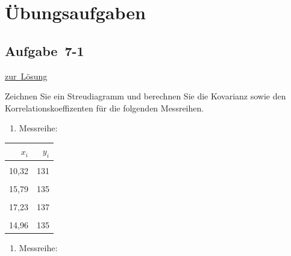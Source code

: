 \documentclass[
  11pt,
  ngerman,
  a4paper,
]{report}
\providecommand{\tightlist}{%
  \setlength{\itemsep}{0pt}\setlength{\parskip}{0pt}}
\begin{document}
\hypertarget{uxfcbungsaufgaben-6}{%
\section*{Übungsaufgaben}\label{uxfcbungsaufgaben-6}}

\hypertarget{aufgabe-7-1}{%
\subsection{Aufgabe~7-1}\label{aufgabe-7-1}}

\protect\hyperlink{loesung-7-1}{zur~Lösung}

Zeichnen Sie ein Streudiagramm und berechnen Sie die Kovarianz sowie den Korrelationskoeffizenten für die folgenden Messreihen.

\begin{enumerate}
\def\labelenumi{\alph{enumi})}
\tightlist
\item
  Messreihe:
\end{enumerate}

\begin{table}
\centering
\begin{tabular}{rr}
\toprule
\textbf{$x_i$} & \textbf{$y_i$}\\
\midrule
\cellcolor{gray!6}{14,21} & \cellcolor{gray!6}{134}\\
10,32 & 131\\
\cellcolor{gray!6}{13,82} & \cellcolor{gray!6}{134}\\
15,79 & 135\\
\cellcolor{gray!6}{14,70} & \cellcolor{gray!6}{134}\\
17,23 & 137\\
\cellcolor{gray!6}{14,84} & \cellcolor{gray!6}{136}\\
14,96 & 135\\
\bottomrule
\end{tabular}
\end{table}

\begin{enumerate}
\def\labelenumi{\alph{enumi})}
\setcounter{enumi}{1}
\tightlist
\item
  Messreihe:
\end{enumerate}
\end{document}
